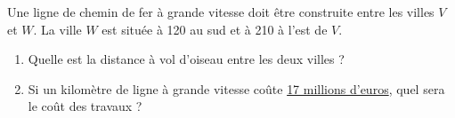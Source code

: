 
\begin{exercice}\label{exosmath-0293}

    Une ligne de chemin de fer à grande vitesse doit être construite entre les villes \( V\) et \( W\). La ville \( W\) est située à \unit{120}{\kilo\meter} au sud et à \unit{210}{\kilo\meter} à l'est de \( V\).
    \begin{enumerate}
        \item
            Quelle est la distance à vol d'oiseau entre les deux villes ?
        \item
            Si un kilomètre de ligne à grande vitesse coûte \href{http://fr.wikipedia.org/wiki/Lgv}{17 millions d'euros}, quel sera le coût des travaux ?
    \end{enumerate}

\end{exercice} 
